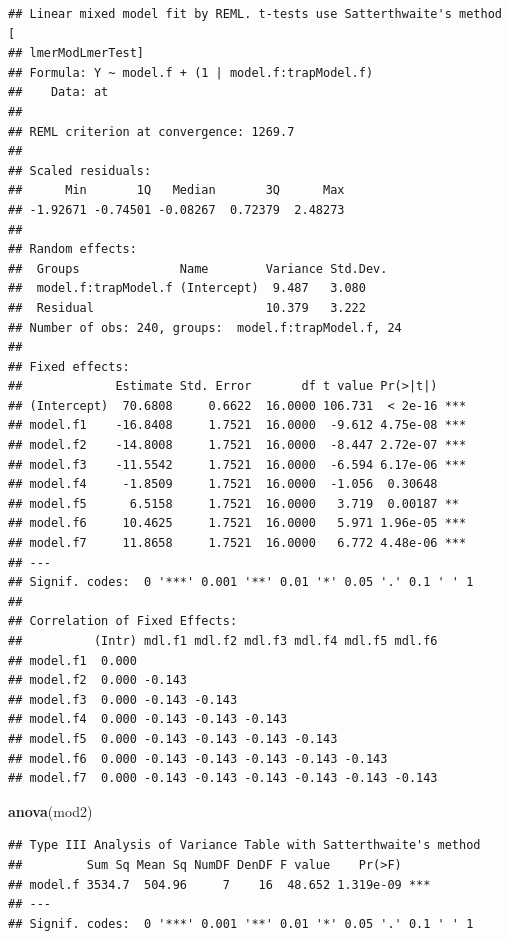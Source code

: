 \documentclass[
]{book}
\newenvironment{Shaded}{\begin{snugshade}}{\end{snugshade}}
\newcommand{\FunctionTok}[1]{\textcolor[rgb]{0.13,0.29,0.53}{\textbf{#1}}}
\newcommand{\NormalTok}[1]{#1}
\begin{document}
\begin{verbatim}
## Linear mixed model fit by REML. t-tests use Satterthwaite's method [
## lmerModLmerTest]
## Formula: Y ~ model.f + (1 | model.f:trapModel.f)
##    Data: at
## 
## REML criterion at convergence: 1269.7
## 
## Scaled residuals: 
##      Min       1Q   Median       3Q      Max 
## -1.92671 -0.74501 -0.08267  0.72379  2.48273 
## 
## Random effects:
##  Groups              Name        Variance Std.Dev.
##  model.f:trapModel.f (Intercept)  9.487   3.080   
##  Residual                        10.379   3.222   
## Number of obs: 240, groups:  model.f:trapModel.f, 24
## 
## Fixed effects:
##             Estimate Std. Error       df t value Pr(>|t|)    
## (Intercept)  70.6808     0.6622  16.0000 106.731  < 2e-16 ***
## model.f1    -16.8408     1.7521  16.0000  -9.612 4.75e-08 ***
## model.f2    -14.8008     1.7521  16.0000  -8.447 2.72e-07 ***
## model.f3    -11.5542     1.7521  16.0000  -6.594 6.17e-06 ***
## model.f4     -1.8509     1.7521  16.0000  -1.056  0.30648    
## model.f5      6.5158     1.7521  16.0000   3.719  0.00187 ** 
## model.f6     10.4625     1.7521  16.0000   5.971 1.96e-05 ***
## model.f7     11.8658     1.7521  16.0000   6.772 4.48e-06 ***
## ---
## Signif. codes:  0 '***' 0.001 '**' 0.01 '*' 0.05 '.' 0.1 ' ' 1
## 
## Correlation of Fixed Effects:
##          (Intr) mdl.f1 mdl.f2 mdl.f3 mdl.f4 mdl.f5 mdl.f6
## model.f1  0.000                                          
## model.f2  0.000 -0.143                                   
## model.f3  0.000 -0.143 -0.143                            
## model.f4  0.000 -0.143 -0.143 -0.143                     
## model.f5  0.000 -0.143 -0.143 -0.143 -0.143              
## model.f6  0.000 -0.143 -0.143 -0.143 -0.143 -0.143       
## model.f7  0.000 -0.143 -0.143 -0.143 -0.143 -0.143 -0.143
\end{verbatim}

\begin{Shaded}
\begin{Highlighting}[]
\FunctionTok{anova}\NormalTok{(mod2)}
\end{Highlighting}
\end{Shaded}

\begin{verbatim}
## Type III Analysis of Variance Table with Satterthwaite's method
##         Sum Sq Mean Sq NumDF DenDF F value    Pr(>F)    
## model.f 3534.7  504.96     7    16  48.652 1.319e-09 ***
## ---
## Signif. codes:  0 '***' 0.001 '**' 0.01 '*' 0.05 '.' 0.1 ' ' 1
\end{verbatim}
\end{document}
